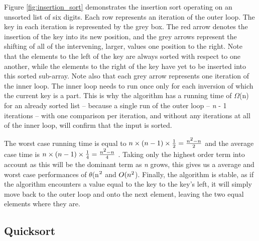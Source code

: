 \documentclass[12pt, a4paper]{article}
\begin{document}
Figure \ref{fig:insertion_sort} demonstrates the insertion sort operating on an unsorted list of six digits. Each row represents an iteration of the outer loop. The key in each iteration is represented by the grey box. The red arrow denotes the insertion of the key into its new position, and the grey arrows represent the shifting of all of the intervening, larger, values one position to the right. Note that the elements to the left of the key are always sorted with respect to one another, while the elements to the right of the key have yet to be inserted into this sorted sub-array. Note also that each grey arrow represents one iteration of the inner loop. The inner loop needs to run once only for each inversion of which the current key is a part. This is why the algorithm has a running time of $\Omega$(n) for an already sorted list -- because a single run of the outer loop -- \emph{n} - 1 iterations -- with one comparison per iteration, and without any iterations at all of the inner loop, will confirm that the input is sorted.

The worst case running time is equal to $n \times (n - 1) \times \frac{1}{2} = \frac{n\textsuperscript{2} - n}{2}$ and the average case time is  $n \times (n - 1) \times \frac{1}{4} = \frac{n\textsuperscript{2} - n}{4}$ \autocite{woltmann20}. Taking only the highest order term into account as this will be the dominant term as \emph{n} grows, this gives us a average and worst case performances of $\theta$(n$\textsuperscript{2}$ and $O(n\textsuperscript{2}$). Finally, the algorithm is stable, as if the algorithm encounters a value equal to the key to the key's left, it will simply move back to the outer loop and onto the next element, leaving the two equal elements where they are.

\subsection{Quicksort}
\end{document}
